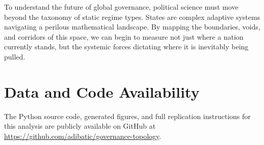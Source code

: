\documentclass[12pt]{article}
\begin{document}
To understand the future of global governance, political science must move beyond the taxonomy of static regime types. States are complex adaptive systems navigating a perilous mathematical landscape. By mapping the boundaries, voids, and corridors of this space, we can begin to measure not just where a nation currently stands, but the systemic forces dictating where it is inevitably being pulled.

\section*{Data and Code Availability}
The Python source code, generated figures, and full replication instructions for this analysis are publicly available on GitHub at \url{https://github.com/adibatic/governance-topology}.



\end{document}
